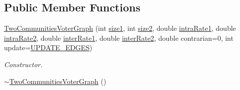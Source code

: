 \subsection*{Public Member Functions}
\begin{DoxyCompactItemize}
\item 
\hyperlink{class_two_communities_voter_graph_a37456a72e366202f8193a9f1935c69a3}{Two\+Communities\+Voter\+Graph} (int \hyperlink{class_two_communities_voter_graph_a3c9db0ac7e58d875ab3ce277bf74b284}{size1}, int \hyperlink{class_two_communities_voter_graph_a8b88457f020773b984e0d8c85d9ee502}{size2}, double \hyperlink{class_two_communities_voter_graph_a96a32ba7529177a7f6b73e827a57791e}{intra\+Rate1}, double \hyperlink{class_two_communities_voter_graph_a6e7ea06e014d75b7bf18441885e07e1e}{intra\+Rate2}, double \hyperlink{class_two_communities_voter_graph_af08c3b9a6e6f1dc8659a38ecd2d1afde}{inter\+Rate1}, double \hyperlink{class_two_communities_voter_graph_afab8bb5994f7fd1370d7d81caf7277d4}{inter\+Rate2}, double contrarian=0, int update=\hyperlink{voter__graph_8hpp_a305d80651467e931f258a3686976d31c}{U\+P\+D\+A\+T\+E\+\_\+\+E\+D\+G\+E\+S})
\begin{DoxyCompactList}\small\item\em Constructor. \end{DoxyCompactList}\item 
\hypertarget{class_two_communities_voter_graph_ab74e186e76188e7de8ae11359ad1e55e}{}\hyperlink{class_two_communities_voter_graph_ab74e186e76188e7de8ae11359ad1e55e}{$\sim$\+Two\+Communities\+Voter\+Graph} ()\label{class_two_communities_voter_graph_ab74e186e76188e7de8ae11359ad1e55e}


\end{DoxyCompactItemize}
